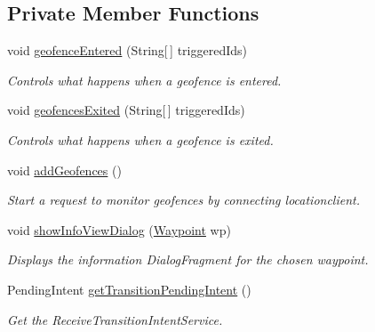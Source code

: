 \subsection*{Private Member Functions}
\begin{DoxyCompactItemize}
\item 
void \hyperlink{classuk_1_1ac_1_1swan_1_1digitaltrails_1_1activities_1_1_map_activity_a98659c22951ea2dd6dd7eef2745a7ee8}{geofence\+Entered} (String\mbox{[}$\,$\mbox{]} triggered\+Ids)
\begin{DoxyCompactList}\small\item\em Controls what happens when a geofence is entered. \end{DoxyCompactList}\item 
void \hyperlink{classuk_1_1ac_1_1swan_1_1digitaltrails_1_1activities_1_1_map_activity_aaeb52643e73deb39b56a3c6cdbdc79c5}{geofences\+Exited} (String\mbox{[}$\,$\mbox{]} triggered\+Ids)
\begin{DoxyCompactList}\small\item\em Controls what happens when a geofence is exited. \end{DoxyCompactList}\item 
void \hyperlink{classuk_1_1ac_1_1swan_1_1digitaltrails_1_1activities_1_1_map_activity_af5854608b6078b8b77755b5bd8984b16}{add\+Geofences} ()
\begin{DoxyCompactList}\small\item\em Start a request to monitor geofences by connecting locationclient. \end{DoxyCompactList}\item 
void \hyperlink{classuk_1_1ac_1_1swan_1_1digitaltrails_1_1activities_1_1_map_activity_acd2b7af825cb8f7d5de44ab574f12811}{show\+Info\+View\+Dialog} (\hyperlink{classuk_1_1ac_1_1swan_1_1digitaltrails_1_1components_1_1_waypoint}{Waypoint} wp)
\begin{DoxyCompactList}\small\item\em Displays the information Dialog\+Fragment for the chosen waypoint. \end{DoxyCompactList}\item 
Pending\+Intent \hyperlink{classuk_1_1ac_1_1swan_1_1digitaltrails_1_1activities_1_1_map_activity_a1b097a9d5dbd1675d32c5aa2d7c1c99d}{get\+Transition\+Pending\+Intent} ()
\begin{DoxyCompactList}\small\item\em Get the Receive\+Transition\+Intent\+Service. \end{DoxyCompactList}\item 

\end{DoxyCompactItemize}
